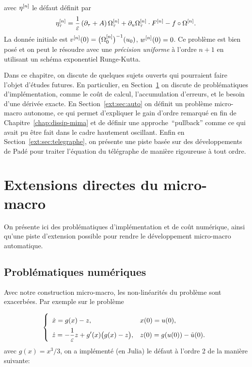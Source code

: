 avec $\eta^{[n]}$ le défaut définit par
\begin{equation} \label{ext:def:eta}
    \eta^{[n]}_{\tau} = 
    \frac{1}{\varepsilon}\left( \partial_{\tau} +  A \right) \Omega^{[n]}_{\tau} 
    + \partial_{u} \Omega^{[n]}_{\tau} \cdot F^{[n]} - f \circ \Omega^{[n]} . 
\end{equation}
La donnée initiale est $v^{[n]} (0) = \big( \Omega^{[n]} _0 \big)^{-1} (u_0)$, $w^{[n]} (0) = 0$. Ce problème est bien posé et on peut le résoudre avec une \textit{précision uniforme} à l'ordre $n+1$ en utilisant un schéma exponentiel Runge-Kutta. 

Dans ce chapitre, on discute de quelques sujets ouverts qui pourraient faire l'objet d'études futures. En particulier, en Section~\ref{ext:sec:direct} on discute de problématiques d'implémentation, comme le coût de calcul, l'accumulation d'erreurs, et le besoin d'une dérivée exacte. En Section~\ref{ext:sec:auto} on définit un problème micro-macro autonome, ce qui permet d'expliquer le gain d'ordre remarqué en fin de Chapitre~\ref{chap:dissip-mima} et de définir une approche~\enquote{pullback} comme ce qui avait pu être fait dans le cadre hautement oscillant. Enfin en Section~\ref{ext:sec:telegraphe}, on présente une piste basée sur des développements de Padé pour traiter l'équation du télégraphe de manière rigoureuse à tout ordre. 


\section{Extensions directes du micro-macro}
\label{ext:sec:direct}

On présente ici des problématiques d'implémentation et de coût numérique, ainsi qu'une piste d'extension possible pour rendre le développement micro-macro automatique.


\subsection{Problématiques numériques}

Avec notre construction micro-macro, les non-linéarités du problème sont exacerbées. Par exemple sur le problème

\begin{equation*} 
    \left\lbrace\begin{array}{ll} \displaystyle \vphantom{\int}
      \dot x = g(x) - z , 
      & x(0) = u(0) , \\ \displaystyle
      \dot z = -\frac{1}{\varepsilon} z + g'(x) \big( g(x) - z \big) ,
      & z(0) = g(u(0)) - \tilde{u}(0) .
    \end{array}\right.
\end{equation*}
avec $g(x) = x^3/3$, on a implémenté (en Julia) le défaut à l'ordre 2 de la manière suivante:


